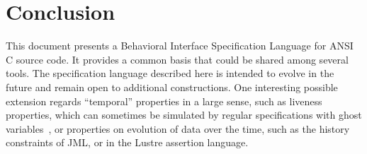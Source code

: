 
\chapter{Conclusion}

This document presents a Behavioral Interface Specification Language
for ANSI C source code. It provides a common basis that could be
shared among several tools.
The specification language described here is intended to evolve in the
future and remain open to additional constructions.
One interesting possible extension regards ``temporal''
properties in a large sense, such as liveness properties, which can
sometimes be simulated by regular specifications with ghost
variables~\cite{giorgetti06fase}, or properties on evolution of data
over the time, such as the history constraints of JML, or in the Lustre
assertion language.




